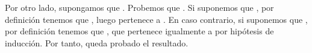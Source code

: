 \begin{isabellebody}
\begin{isamarkuptext}
\begin{demostracion}
    Por otro lado, supongamos que . Probemos que . Si suponemos que ,
    por definición tenemos que , luego pertenece a . En caso contrario, si
    suponemos que , por definición tenemos que , que pertenece igualmente
    a  por hipótesis de inducción. Por tanto, queda probado el resultado.
  \end{demostracion}


\end{isamarkuptext}
\end{isabellebody}
